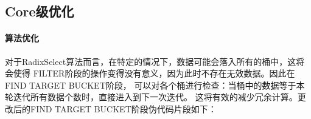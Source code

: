 \subsection{Core级优化}

\paragraph{算法优化}
对于RadixSelect算法而言，在特定的情况下，数据可能会落入所有的桶中，这将会使得
FILTER阶段的操作变得没有意义，因为此时不存在无效数据。因此在FIND TARGET BUCKET阶段，
可以对各个桶进行检查：当桶中的数据等于本轮迭代所有数据个数时，直接进入到下一次迭代。
这将有效的减少冗余计算。更改后的FIND TARGET BUCKET阶段伪代码片段如下：
            


